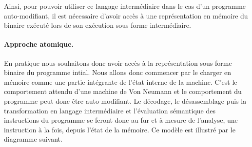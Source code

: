 Ainsi, pour pouvoir utiliser ce langage intermédiaire dans le cas d'un programme auto-modifiant, il est nécessaire d'avoir accès à une représentation en mémoire du binaire exécuté lors de son exécution sous forme intermédiaire.




\paragraph{Approche atomique.}
En pratique nous souhaitons donc avoir accès à la représentation sous forme binaire du programme intial.
Nous allons donc commencer par le charger en mémoire comme une partie intégrante de l'état interne de la machine.
C'est le comportement attendu d'une machine de Von Neumann et le comportement du programme peut donc être auto-modifiant. Le décodage, le désassemblage puis la transformation en langage intermédiaire et l'évaluation sémantique des instructions du programme se feront donc au fur et à mesure de l'analyse, une instruction à la fois, depuis l'état de la mémoire.
Ce modèle est illustré par le diagramme suivant.

